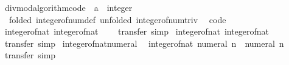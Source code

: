 \begin{isabellebody}
\endisatagproof
{\isafoldproof}%
%
\isadelimproof
%
\endisadelimproof
\isanewline
\isanewline
{}\isamarkupfalse%
\isanewline
\isanewline
{}\isamarkupfalse%
\ divmod{\isacharunderscore}{\kern0pt}algorithm{\isacharunderscore}{\kern0pt}code\ {\isacharbrackleft}{\kern0pt}\ {\isacharquery}{\kern0pt}{\isacharprime}{\kern0pt}a\ {\isacharequal}{\kern0pt}\ integer{\isacharcomma}{\kern0pt}\isanewline
\ \ folded\ integer{\isacharunderscore}{\kern0pt}of{\isacharunderscore}{\kern0pt}num{\isacharunderscore}{\kern0pt}def{\isacharcomma}{\kern0pt}\ unfolded\ integer{\isacharunderscore}{\kern0pt}of{\isacharunderscore}{\kern0pt}num{\isacharunderscore}{\kern0pt}triv{\isacharcomma}{\kern0pt}\isanewline
\ \ code{\isacharbrackright}{\kern0pt}\isanewline
\isanewline
{}\isamarkupfalse%
\ integer{\isacharunderscore}{\kern0pt}of{\isacharunderscore}{\kern0pt}nat{\isacharunderscore}{\kern0pt}{}{\isacharcolon}{\kern0pt}\ {\isachardoublequoteopen}integer{\isacharunderscore}{\kern0pt}of{\isacharunderscore}{\kern0pt}nat\ {}\ {\isacharequal}{\kern0pt}\ {}{\isachardoublequoteclose}\isanewline
%
\isadelimproof
%
\endisadelimproof
%
\isatagproof
{}\isamarkupfalse%
\ transfer\ simp%
\endisatagproof
{\isafoldproof}%
%
\isadelimproof
\isanewline
%
\endisadelimproof
\isanewline
{}\isamarkupfalse%
\ integer{\isacharunderscore}{\kern0pt}of{\isacharunderscore}{\kern0pt}nat{\isacharunderscore}{\kern0pt}{}{\isacharcolon}{\kern0pt}\ {\isachardoublequoteopen}integer{\isacharunderscore}{\kern0pt}of{\isacharunderscore}{\kern0pt}nat\ {}\ {\isacharequal}{\kern0pt}\ {}{\isachardoublequoteclose}\isanewline
%
\isadelimproof
%
\endisadelimproof
%
\isatagproof
{}\isamarkupfalse%
\ transfer\ simp%
\endisatagproof
{\isafoldproof}%
%
\isadelimproof
\isanewline
%
\endisadelimproof
\isanewline
{}\isamarkupfalse%
\ integer{\isacharunderscore}{\kern0pt}of{\isacharunderscore}{\kern0pt}nat{\isacharunderscore}{\kern0pt}numeral{\isacharcolon}{\kern0pt}\isanewline
\ \ {\isachardoublequoteopen}integer{\isacharunderscore}{\kern0pt}of{\isacharunderscore}{\kern0pt}nat\ {\isacharparenleft}{\kern0pt}numeral\ n{\isacharparenright}{\kern0pt}\ {\isacharequal}{\kern0pt}\ numeral\ n{\isachardoublequoteclose}\isanewline
%
\isadelimproof
%
\endisadelimproof
%
\isatagproof
{}\isamarkupfalse%
\ transfer\ simp%
\endisatagproof
{\isafoldproof}%
%
\isadelimproof
%
\endisadelimproof
%
\isadelimdocument
%
\endisadelimdocument
%
\isatagdocument

\end{isabellebody}
